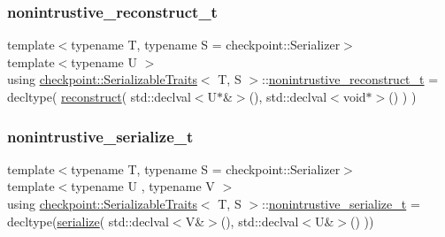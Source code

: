 \mbox{\label{structcheckpoint_1_1_serializable_traits_abe5231bdf561e55fd9e0673e42a8a96c}} 
\subsubsection{\texorpdfstring{nonintrustive\+\_\+reconstruct\+\_\+t}{nonintrustive\_reconstruct\_t}}
{\footnotesize\ttfamily template$<$typename T, typename S = checkpoint\+::\+Serializer$>$ \\
template$<$typename U $>$ \\
using \hyperlink{structcheckpoint_1_1_serializable_traits}{checkpoint\+::\+Serializable\+Traits}$<$ T, S $>$\+::\hyperlink{structcheckpoint_1_1_serializable_traits_abe5231bdf561e55fd9e0673e42a8a96c}{nonintrustive\+\_\+reconstruct\+\_\+t} =  decltype( \hyperlink{namespacecheckpoint_a6254f2e220f905a2b0c797c08092a7a1}{reconstruct}( std\+::declval$<$U$\ast$\&$>$(), std\+::declval$<$void$\ast$$>$() ) )}

\mbox{\label{structcheckpoint_1_1_serializable_traits_a3284d2cfd29cfe429d5cf76186d3fe3c}} 
\subsubsection{\texorpdfstring{nonintrustive\+\_\+serialize\+\_\+t}{nonintrustive\_serialize\_t}}
{\footnotesize\ttfamily template$<$typename T, typename S = checkpoint\+::\+Serializer$>$ \\
template$<$typename U , typename V $>$ \\
using \hyperlink{structcheckpoint_1_1_serializable_traits}{checkpoint\+::\+Serializable\+Traits}$<$ T, S $>$\+::\hyperlink{structcheckpoint_1_1_serializable_traits_a3284d2cfd29cfe429d5cf76186d3fe3c}{nonintrustive\+\_\+serialize\+\_\+t} =  decltype(\hyperlink{namespacecheckpoint_a075da4e7344cf037943362517e606c3a}{serialize}( std\+::declval$<$V\&$>$(), std\+::declval$<$U\&$>$() ))}

